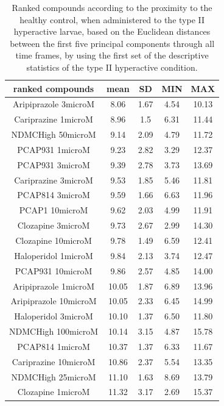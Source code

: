 \begin{table}[h!]\tiny
\centering
\caption{Ranked compounds according to the proximity to the healthy control, when administered to the type II hyperactive larvae, based on the Euclidean distances between the first five principal components through all time frames, by using the first set of the descriptive statistics of the type II hyperactive condition.}
\begin{tabular}{|c|c|c|c|c|}
\hline
ranked compounds             & mean & SD   & MIN  & MAX   \\ \hline
Aripiprazole 3microM  & 8.06  & 1.67 & 4.54  & 10.13 \\ \hline
Cariprazine 1microM   & 8.96  & 1.5  & 6.31  & 11.44 \\ \hline
NDMCHigh 50microM     & 9.14  & 2.09 & 4.79  & 11.72 \\ \hline
PCAP931 1microM       & 9.23  & 2.82 & 3.29  & 12.37 \\ \hline
PCAP931 3microM       & 9.39  & 2.78 & 3.73  & 13.69 \\ \hline
Cariprazine 3microM   & 9.53  & 1.85 & 5.46  & 11.81 \\ \hline
PCAP814 3microM       & 9.59  & 1.66 & 6.63  & 11.96 \\ \hline
PCAP1 10microM        & 9.62  & 2.03 & 4.99  & 11.91 \\ \hline
Clozapine 3microM     & 9.73  & 2.67 & 2.99  & 14.30  \\ \hline
Clozapine 10microM    & 9.78  & 1.49 & 6.59  & 12.41 \\ \hline
Haloperidol 1microM   & 9.84  & 2.13 & 3.74  & 12.47 \\ \hline
PCAP931 10microM      & 9.86  & 2.57 & 4.85  & 14.00    \\ \hline
Aripiprazole 1microM  & 10.05 & 1.87 & 6.89  & 13.96 \\ \hline
Aripiprazole 10microM & 10.05 & 2.33 & 6.45  & 14.99 \\ \hline
Haloperidol 3microM   & 10.10  & 1.37 & 6.50   & 11.80  \\ \hline
NDMCHigh 100microM    & 10.14 & 3.15 & 4.87  & 15.78 \\ \hline
PCAP814 1microM       & 10.37 & 1.37 & 6.33  & 11.67 \\ \hline
Cariprazine 10microM  & 10.86 & 2.37 & 5.54  & 13.35 \\ \hline
NDMCHigh 25microM     & 11.10  & 1.63 & 8.69  & 13.79 \\ \hline
Clozapine 1microM     & 11.32 & 3.17 & 2.69  & 15.37 \\ \hline

\end{tabular}
\end{table}

